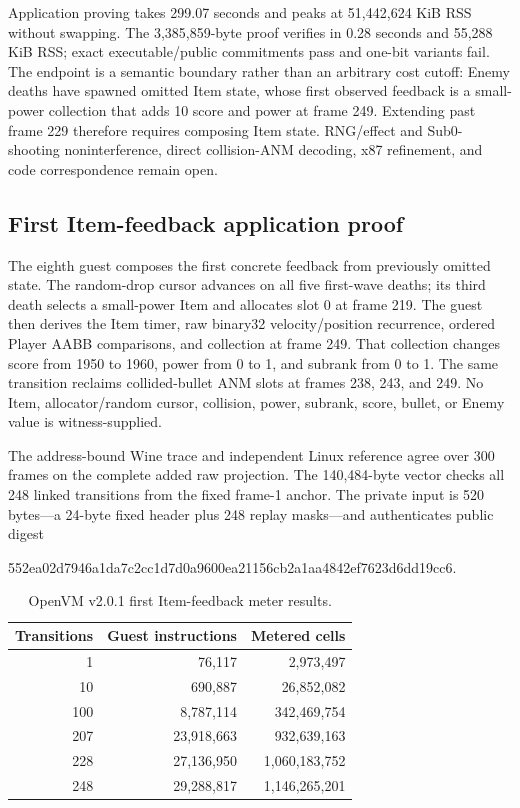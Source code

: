 Application proving takes 299.07 seconds and peaks at 51,442,624 KiB RSS
without swapping.  The 3,385,859-byte proof verifies in 0.28 seconds and
55,288 KiB RSS; exact executable/public commitments pass and one-bit variants
fail.  The endpoint is a semantic boundary rather than an arbitrary cost
cutoff: Enemy deaths have spawned omitted Item state, whose first observed
feedback is a small-power collection that adds 10 score and power at frame
249.  Extending past frame 229 therefore requires composing Item state.
RNG/effect and Sub0-shooting noninterference, direct collision-ANM decoding,
x87  refinement, and code correspondence remain open.

\subsection{First Item-feedback application proof}

The eighth guest composes the first concrete feedback from previously omitted
state.  The random-drop cursor advances on all five first-wave deaths; its third
death selects a small-power Item and allocates slot 0 at frame 219.  The guest
then derives the Item timer, raw binary32 velocity/position recurrence, ordered
Player AABB comparisons, and collection at frame 249.  That collection changes
score from 1950 to 1960, power from 0 to 1, and subrank from 0 to 1.  The same
transition reclaims collided-bullet ANM slots at frames 238, 243, and 249.  No
Item, allocator/random cursor, collision, power, subrank, score, bullet, or
Enemy value is witness-supplied.

The address-bound Wine trace and independent Linux reference agree over 300
frames on the complete added raw projection.  The 140,484-byte 
vector checks all 248 linked transitions from the fixed frame-1 anchor.  The
private  input is 520 bytes---a 24-byte fixed header plus 248 replay
masks---and authenticates public digest
\begin{center}
\small\ttfamily
552ea02d7946a1da7c2cc1d7d0a9600ea21156cb2a1aa4842ef7623d6dd19cc6.
\end{center}

\begin{table}[h]
  \centering
  \small
  \begin{tabular}{@{}rrr@{}}
    \toprule
    Transitions & Guest instructions & Metered cells \\
    \midrule
    1   & 76,117     & 2,973,497 \\
    10  & 690,887    & 26,852,082 \\
    100 & 8,787,114  & 342,469,754 \\
    207 & 23,918,663 & 932,639,163 \\
    228 & 27,136,950 & 1,060,183,752 \\
    248 & 29,288,817 & 1,146,265,201 \\
    \bottomrule
  \end{tabular}
  \caption{OpenVM v2.0.1 first Item-feedback meter results.}
  \label{tab:openvm-first-item-meter}
\end{table}

